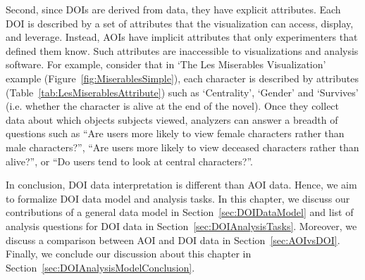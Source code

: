 Second, since DOIs are derived from data, they have explicit attributes. Each DOI is described by a set of attributes that the visualization can access, display, and leverage. Instead, AOIs have implicit attributes that only experimenters that defined them know. Such attributes are inaccessible to visualizations and analysis software. For example, consider that in `The Les Miserables Visualization' example (Figure~\ref{fig:MiserablesSimple}), each character is described by attributes (Table~\ref{tab:LesMiserablesAttribute}) such as `Centrality', `Gender' and `Survives' (i.e. whether the character is alive at the end of the novel). Once they collect data about which objects subjects viewed, analyzers can answer a breadth of questions such as ``Are users more likely to view female characters rather than male characters?'', ``Are users more likely to view deceased characters rather than alive?'', or ``Do users tend to look at central characters?''. 

In conclusion, DOI data interpretation is different than AOI data. Hence, we aim to formalize DOI data model and analysis tasks. In this chapter, we discuss our contributions of a general data model in Section~\ref{sec:DOIDataModel} and list of analysis questions for DOI data in Section~\ref{sec:DOIAnalysisTasks}. Moreover, we discuss a comparison between AOI and DOI data in Section~\ref{sec:AOIvsDOI}. Finally, we conclude our discussion about this chapter in Section~\ref{sec:DOIAnalysisModelConclusion}.


